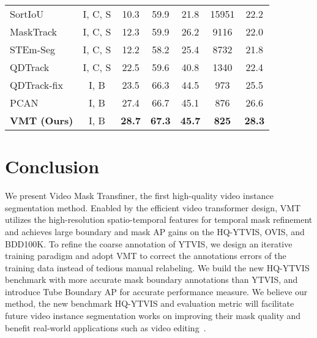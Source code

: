 \documentclass[runningheads]{llncs}
\begin{document}
\begin{table}[!t]
\begin{minipage}[t]{0.55\linewidth}
{\begin{tabular}{lcccccc}
					\hline
					SortIoU & I, C, S  & 10.3 & 59.9 & 21.8 & 15951 & 22.2 \\ MaskTrack~\cite{voigtlaender2019feelvos} & I, C, S & 12.3 & 59.9 & 26.2 & 9116 & 22.0 \\
					STEm-Seg~\cite{Athar_Mahadevan20ECCV} & I, C, S  & 12.2 & 58.2 & 25.4 & 8732 & 21.8 \\
					QDTrack~\cite{qdtrack} & I, C, S  & 22.5 & 59.6 & 40.8 & 1340  & 22.4 \\
					QDTrack-fix~\cite{qdtrack} & I, B & 23.5 & 66.3 & 44.5 & 973 & 25.5 \\
					PCAN~\cite{pcan} & I, B  & 27.4 & 66.7 & 45.1 & 876 & 26.6 \\
					\hline
					\textbf{VMT (Ours)} & I, B  & \textbf{28.7} & \textbf{67.3} & \textbf{45.7} & \textbf{825} &  \textbf{28.3} \\
\bottomrule
			\end{tabular}}
			\label{tab:bdd}
		\end{minipage}\end{table}
	

\section{Conclusion}

We present Video Mask Transfiner, the first high-quality video instance segmentation method. 
Enabled by the efficient video transformer design, VMT utilizes the high-resolution spatio-temporal features for temporal mask refinement and achieves large boundary and mask AP gains on the HQ-YTVIS, OVIS, and BDD100K.
To refine the coarse annotation of YTVIS, we design an iterative training paradigm and adopt VMT to correct the annotations errors of the training data instead of tedious manual relabeling. 
We build the new HQ-YTVIS benchmark with more accurate mask boundary annotations than YTVIS, and introduce Tube Boundary AP for accurate performance measure. 
We believe our method, the new benchmark HQ-YTVIS and evaluation metric will facilitate future video instance segmentation works on improving their mask quality and benefit real-world applications such as video editing~\cite{alldieck2018video,ke2021voin}.








\end{document}
